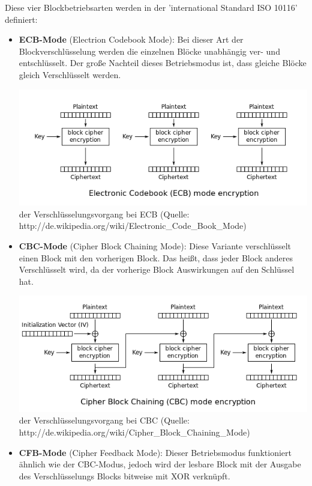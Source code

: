 \documentclass[12pt,a4paper]{report}
\begin{document}
Diese vier Blockbetriebsarten werden in der 'international Standard ISO 10116' definiert:

\begin{itemize}
\item \textbf{ECB-Mode} (Electrion Codebook Mode): Bei dieser Art der Blockverschlüsselung werden die einzelnen Blöcke unabhängig ver- und entschlüsselt. Der große Nachteil dieses Betriebsmodus ist, dass gleiche Blöcke gleich Verschlüsselt werden.

\begin{center}
\includegraphics[scale=0.7]{img/ecb.png}\\
der Verschlüsselungsvorgang bei ECB (Quelle: http://de.wikipedia.org/wiki/Electronic\_Code\_Book\_Mode)
\end{center}

\item \textbf{CBC-Mode} (Cipher Block Chaining Mode): Diese Variante verschlüsselt einen Block mit den vorherigen Block. Das heißt, dass jeder Block anderes Verschlüsselt wird, da der vorherige Block Auswirkungen auf den Schlüssel hat.

\begin{center}
\includegraphics[scale=0.7]{img/cbc.png}\\
der Verschlüsselungsvorgang bei CBC (Quelle: http://de.wikipedia.org/wiki/Cipher\_Block\_Chaining\_Mode)
\end{center}

\item \textbf{CFB-Mode} (Cipher Feedback Mode): Dieser Betriebsmodus funktioniert ähnlich wie der CBC-Modus, jedoch wird der lesbare Block mit der Ausgabe des Verschlüsselungs Blocks bitweise mit XOR verknüpft.


\end{itemize}
\end{document}
